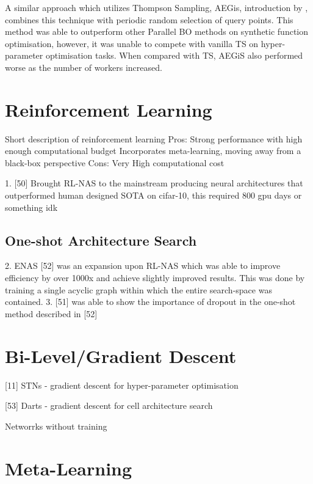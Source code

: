 \documentclass{article}
\begin{document}
			A similar approach which utilizes Thompson Sampling, AEGis, introduction by \cite{26}, combines this technique with periodic random selection of query points. This method was able to outperform other Parallel BO methods on synthetic function optimisation, however, it was unable to compete with vanilla TS on hyper-parameter optimisation tasks. When compared with TS, AEGiS also performed worse as the number of workers increased.




\section{Reinforcement Learning}

    Short description of reinforcement learning 
    Pros:
        Strong performance with high enough computational budget
        Incorporates meta-learning, moving away from a black-box perspective
    Cons:
        Very High computational cost

    1. [50] Brought RL-NAS to the mainstream producing neural architectures that outperformed human designed SOTA on cifar-10, this required 800 gpu days or something idk
  
    \subsection{One-shot Architecture Search}
    2. ENAS [52] was an expansion upon RL-NAS which was able to improve efficiency by over 1000x and achieve slightly improved results. This was done by training a single acyclic graph within which the entire search-space was contained. 
    3. [51] was able to show the importance of dropout in the one-shot method described in [52] 




\section{Bi-Level/Gradient Descent}

	[11] STNs - gradient descent for hyper-parameter optimisation

	[53] Darts - gradient descent for cell architecture search  

	Networrks without training
    



\section{Meta-Learning}
\end{document}
